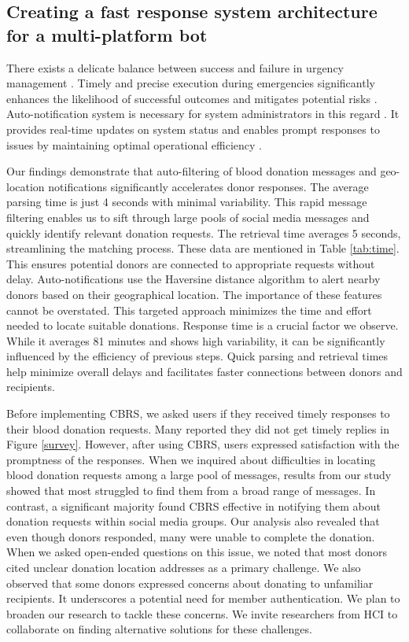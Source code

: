 \documentclass[11pt]{article}
\begin{document}
\subsection{Creating a fast response system architecture for a multi-platform bot}
There exists a delicate balance between success and failure in urgency management \cite{32joshi2017drasb}. Timely and precise execution during emergencies significantly enhances the likelihood of successful outcomes and mitigates potential risks \cite{32joshi2017drasb}. Auto-notification system is necessary for system administrators in this regard \cite{33aziz2010proactive}. It provides real-time updates on system status and enables prompt responses to issues by maintaining optimal operational efficiency \cite{33aziz2010proactive}. 

Our findings demonstrate that auto-filtering of blood donation messages and geo-location notifications significantly accelerates donor responses. The average parsing time is just 4 seconds with minimal variability. This rapid message filtering enables us to sift through large pools of social media messages and quickly identify relevant donation requests. The retrieval time averages 5 seconds, streamlining the matching process. These data are mentioned in Table \ref{tab:time}. This ensures potential donors are connected to appropriate requests without delay. Auto-notifications use the Haversine distance algorithm to alert nearby donors based on their geographical location. The importance of these features cannot be overstated. This targeted approach minimizes the time and effort needed to locate suitable donations. Response time is a crucial factor we observe. While it averages 81 minutes and shows high variability, it can be significantly influenced by the efficiency of previous steps. Quick parsing and retrieval times help minimize overall delays and facilitates faster connections between donors and recipients.

Before implementing CBRS, we asked users if they received timely responses to their blood donation requests. Many reported they did not get timely replies in Figure \ref{survey}. However, after using CBRS, users expressed satisfaction with the promptness of the responses. When we inquired about difficulties in locating blood donation requests among a large pool of messages, results from our study showed that most struggled to find them from a broad range of messages. In contrast, a significant majority found CBRS effective in notifying them about donation requests within social media groups. Our analysis also revealed that even though donors responded, many were unable to complete the donation. When we asked open-ended questions on this issue, we noted that most donors cited unclear donation location addresses as a primary challenge. We also observed that some donors expressed concerns about donating to unfamiliar recipients. It underscores a potential need for member authentication. We plan to broaden our research to tackle these concerns. We invite researchers from HCI to collaborate on finding alternative solutions for these challenges.
\end{document}
